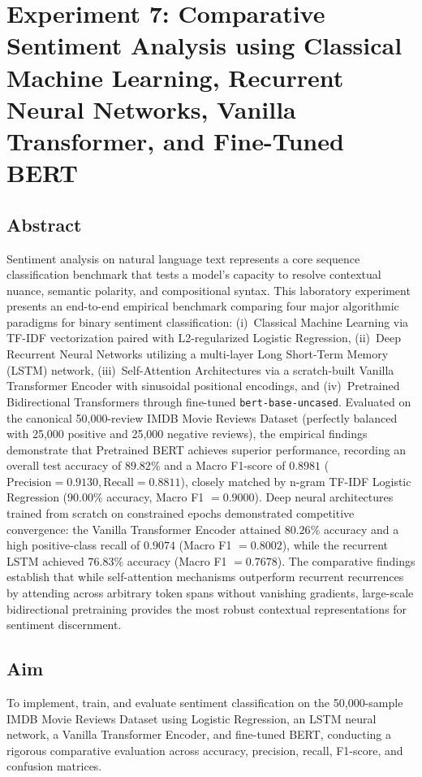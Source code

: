\chapter{Experiment 7: Comparative Sentiment Analysis using Classical Machine Learning, Recurrent Neural Networks, Vanilla Transformer, and Fine-Tuned BERT}
\label{chap:exp7}

\section{Abstract}
Sentiment analysis on natural language text represents a core sequence classification benchmark that tests a model's capacity to resolve contextual nuance, semantic polarity, and compositional syntax. This laboratory experiment presents an end-to-end empirical benchmark comparing four major algorithmic paradigms for binary sentiment classification: (i)~Classical Machine Learning via TF-IDF vectorization paired with L2-regularized Logistic Regression, (ii)~Deep Recurrent Neural Networks utilizing a multi-layer Long Short-Term Memory (LSTM) network, (iii)~Self-Attention Architectures via a scratch-built Vanilla Transformer Encoder with sinusoidal positional encodings, and (iv)~Pretrained Bidirectional Transformers through fine-tuned \texttt{bert-base-uncased}. Evaluated on the canonical 50,000-review IMDB Movie Reviews Dataset (perfectly balanced with 25,000 positive and 25,000 negative reviews), the empirical findings demonstrate that Pretrained BERT achieves superior performance, recording an overall test accuracy of $89.82\%$ and a Macro F1-score of $0.8981$ ($\text{Precision}=0.9130, \text{Recall}=0.8811$), closely matched by n-gram TF-IDF Logistic Regression ($90.00\%$ accuracy, Macro F1 $= 0.9000$). Deep neural architectures trained from scratch on constrained epochs demonstrated competitive convergence: the Vanilla Transformer Encoder attained $80.26\%$ accuracy and a high positive-class recall of $0.9074$ (Macro F1 $= 0.8002$), while the recurrent LSTM achieved $76.83\%$ accuracy (Macro F1 $= 0.7678$). The comparative findings establish that while self-attention mechanisms outperform recurrent recurrences by attending across arbitrary token spans without vanishing gradients, large-scale bidirectional pretraining provides the most robust contextual representations for sentiment discernment.

\section{Aim}
To implement, train, and evaluate sentiment classification on the 50,000-sample IMDB Movie Reviews Dataset using Logistic Regression, an LSTM neural network, a Vanilla Transformer Encoder, and fine-tuned BERT, conducting a rigorous comparative evaluation across accuracy, precision, recall, F1-score, and confusion matrices.

